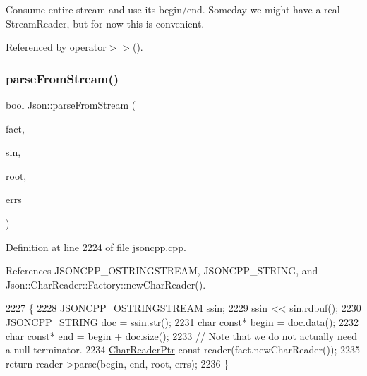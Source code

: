 Consume entire stream and use its begin/end. Someday we might have a real Stream\+Reader, but for now this is convenient. 

Referenced by operator$>$$>$().

\mbox{\label{namespace_json_a38f903cfdb57a6c4e86a7dcc42f3712c}} 
\subsubsection{\texorpdfstring{parse\+From\+Stream()}{parseFromStream()}\hspace{0.1cm}{\footnotesize\ttfamily [2/2]}}
{\footnotesize\ttfamily bool Json\+::parse\+From\+Stream (\begin{DoxyParamCaption}\item[{\hyperlink{class_json_1_1_char_reader_1_1_factory}{Char\+Reader\+::\+Factory} const \&}]{fact,  }\item[{\hyperlink{json_8h_a15f2f70b2ce0a2abd0f8112393dbc4de}{J\+S\+O\+N\+C\+P\+P\+\_\+\+I\+S\+T\+R\+E\+AM} \&}]{sin,  }\item[{\hyperlink{class_json_1_1_value}{Value} $\ast$}]{root,  }\item[{\hyperlink{json_8h_a1e723f95759de062585bc4a8fd3fa4be}{J\+S\+O\+N\+C\+P\+P\+\_\+\+S\+T\+R\+I\+NG} $\ast$}]{errs }\end{DoxyParamCaption})}



Definition at line 2224 of file jsoncpp.\+cpp.



References J\+S\+O\+N\+C\+P\+P\+\_\+\+O\+S\+T\+R\+I\+N\+G\+S\+T\+R\+E\+AM, J\+S\+O\+N\+C\+P\+P\+\_\+\+S\+T\+R\+I\+NG, and Json\+::\+Char\+Reader\+::\+Factory\+::new\+Char\+Reader().


\begin{DoxyCode}
2227 \{
2228   \hyperlink{json_8h_a1d06ac2ca63c8c521f41231dfda0e6b3}{JSONCPP\_OSTRINGSTREAM} ssin;
2229   ssin << sin.rdbuf();
2230   \hyperlink{json_8h_a1e723f95759de062585bc4a8fd3fa4be}{JSONCPP\_STRING} doc = ssin.str();
2231   \textcolor{keywordtype}{char} \textcolor{keyword}{const}* begin = doc.data();
2232   \textcolor{keywordtype}{char} \textcolor{keyword}{const}* end = begin + doc.size();
2233   \textcolor{comment}{// Note that we do not actually need a null-terminator.}
2234   \hyperlink{namespace_json_a4724efb8d41614b47036cb8b54233837}{CharReaderPtr} \textcolor{keyword}{const} reader(fact.newCharReader());
2235   \textcolor{keywordflow}{return} reader->parse(begin, end, root, errs);
2236 \}
\end{DoxyCode}
\mbox{\label{namespace_json_a48f4e3ea655e3b4a5d7f892c81f00511}} 
